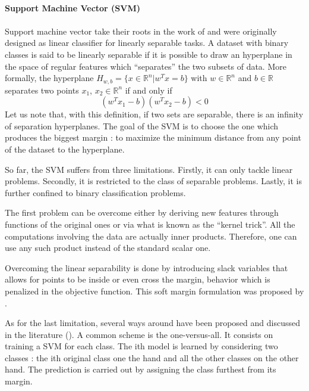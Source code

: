 \documentclass[a4paper]{report}
\begin{document}
		\begin{leftbar}
			\paragraph{Support Machine Vector (SVM)}
			\paragraph{}
			Support machine vector take their roots in the work of \cite{svm} and were originally designed as linear classifier for linearly separable tasks. A dataset with binary classes is said to be linearly separable if it is possible to draw an hyperplane in the space of regular features which ``separates'' the two subsets of data.
			More formally, the hyperplane $H_{w,b} = \{x \in \mathbb{R}^n | w^T x = b\}$ with $w \in \mathbb{R}^n$ and $b \in \mathbb{R}$ separates two points $x_1$, $x_2 \in \mathbb{R}^n$ if and only if 
			\[
				(w^T x_1 - b)(w^T x_2 - b) < 0
			\] 
			Let us note that, with this definition, if two sets are separable, there is an infinity of separation hyperplanes. The goal of the SVM is to choose the one which produces the biggest margin : to maximize the minimum distance from any point of the dataset to the hyperplane.
			\par
			So far, the SVM suffers from three limitations. Firstly, it can only tackle linear problems. Secondly, it is restricted to the class of separable problems. Lastly, it is further confined to binary classification problems. 
			\par
			The first problem can be overcome either by deriving new features through functions of the original ones or via what is known as the ``kernel trick''. All the computations involving the data are actually inner products. Therefore, one can use any such product instead of the standard scalar one. 
			\par
			Overcoming the linear separability is done by introducing slack variables that allows for points to be inside or even cross the margin, behavior which is penalized in the objective function. This soft margin formulation was proposed by \cite{svmsoft}.
			\par
			As for the last limitation, several ways around have been proposed and discussed in the literature (\cite{svmmulticlass}). A common scheme is the one-versus-all. It consists on training a SVM for each class. The ith model is learned by considering two classes : the ith original class one the hand and all the other classes on the other hand. The prediction is carried out by assigning the class furthest from its margin.
		\end{leftbar}
\end{document}
